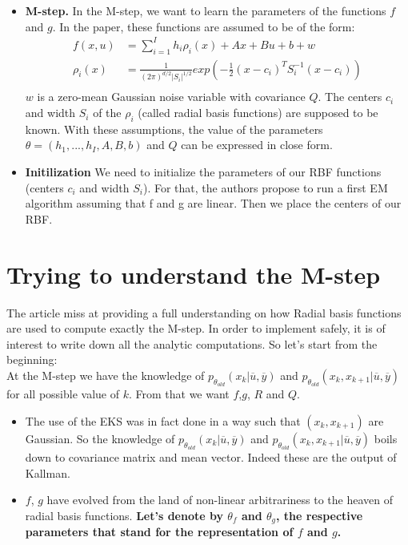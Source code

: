 \documentclass[11pt, oneside]{amsart}
\begin{document}
\begin{itemize}
  \item \textbf{M-step.}
    In the M-step, we want to learn the parameters of the functions $f$ and $g$.
    In the paper, these functions are assumed to be of the form:
    \begin{align*}
      f(x,u) &= \sum_{i=1}^I h_i \rho_i(x) + Ax + Bu + b + w\\
      \rho_i(x) &= \frac{1}{(2\pi)^{d/2}|S_i|^{1/2}} exp\left(-\frac{1}{2}(x-c_i)^TS_i^{-1}(x-c_i)\right)\\
    \end{align*}
    $w$ is a zero-mean Gaussian noise variable with covariance $Q$.
    The centers $c_i$ and width $S_i$ of the $\rho_i$ (called radial basis functions) are supposed to be known.
    With these assumptions, the value of the parameters $\theta = \left( h_1, ..., h_I, A, B, b\right)$ and $Q$ can be expressed in close form.
\item \textbf{Initilization}
We need to initialize the parameters of our RBF functions (centers $c_i$ and width $S_i$).
For that, the authors propose to run a first EM algorithm assuming that f and g are linear.
Then we place the centers of our RBF. \\
\end{itemize}





\section{Trying to understand the M-step}
The article miss at providing a full understanding on how Radial basis functions are used to compute exactly the M-step. In order to implement safely, it is of interest to write down all the analytic computations. So let's start from the beginning:\\

At the M-step we have the knowledge of $p_{\theta_{old}}(x_k|\overline{u},\overline{y})$ and $p_{\theta_{old}}(x_k,x_{k+1}|\overline{u},\overline{y})$ for all possible value of $k$. From that we want $f$,$g$, $R$ and $Q$.\\ 

\begin{itemize}
\item The use of the EKS was in fact done in a way such that $(x_k,x_{k+1})$ are Gaussian. So the knowledge of $p_{\theta_{old}}(x_k|\overline{u},\overline{y})$ and $p_{\theta_{old}}(x_k,x_{k+1}|\overline{u},\overline{y})$ boils down to covariance matrix and mean vector. Indeed these are the output of Kallman.
\item $f$, $g$ have evolved from the land of non-linear arbitrariness to the heaven of radial basis functions. \textbf{Let's denote by $\theta_f$ and $\theta_g$, the respective parameters that stand for the representation of $f$ and $g$.}
\end{itemize}
\end{document}
